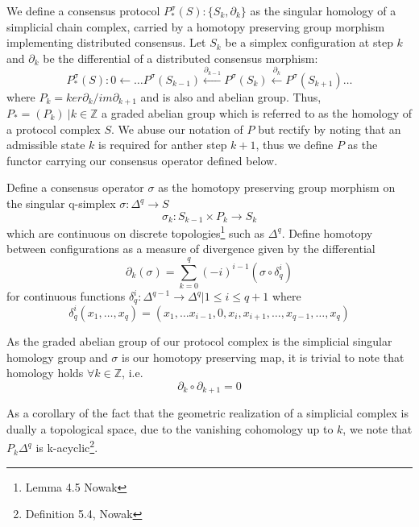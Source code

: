 \documentclass{article}
\begin{document}
We define a consensus protocol $P^\sigma_{*}(S):\{S_k, \partial_k\}$ as the singular homology of a simplicial chain complex, carried by a homotopy preserving group morphism implementing distributed consensus. Let $S_k$ be a simplex configuration at step $k$ and $\partial_k$ be the differential of a distributed consensus morphism:
\begin{equation} \label{eq1}
P^\sigma_{*}(S): 0 \leftarrow \dots P^\sigma(S_{k-1})\xleftarrow {\partial_{k-1}} P^\sigma(S_{k})\xleftarrow {\partial_{k}} P^\sigma(S_{k+1}) \dots
\end{equation} \label{eq1}
where $P_k = ker \partial_k / im \partial_{k+1}$ and is also and abelian group. Thus, $P_*= (P_k) \ | k \in \mathbb{Z}$ a graded abelian group which is referred to as the homology of a protocol complex $S$. We abuse our notation of $P$ but rectify by noting that an admissible state $k$ is required for anther step $k + 1$, thus we define $P$ as the functor carrying our consensus operator defined below.

Define a consensus operator $\sigma$ as the homotopy preserving group morphism on the singular q-simplex $\sigma: \Delta^q \rightarrow S$ 
\begin{equation} \label{eq1}
\sigma_k: S_{k-1} \times P_k \rightarrow S_{k}
\end{equation} \label{eq1}
which are continuous on discrete topologies\footnote{Lemma 4.5 Nowak} such as $\Delta^q$. Define homotopy between configurations as a measure of divergence given by the differential 
\begin{equation} \label{eq1}
\partial_k(\sigma) = \sum^{q}_{k=0} (-i)^{i-1}(\sigma \circ \delta_q^{i} )
\end{equation} \label{eq1}
for continuous functions $\delta^{i}_q: \Delta^{q-1} \rightarrow \Delta^q | 1 \leq i \leq q+1$ where 
\begin{equation} \label{eq1}
\delta^{i}_q(x_1, \dots, x_q) = (x_1, \dots x_{i-1}, 0, x_i, x_{i+1}, \dots, x_{q-1}, \dots, x_q)
\end{equation} \label{eq1}

As the graded abelian group of our protocol complex is the simplicial singular homology group and $\sigma$ is our homotopy preserving map, it is trivial to note that homology holds $\forall k \in \mathbb{Z}$, i.e.
\begin{equation} \label{eq1}
\partial_k \circ \partial_{k+1} = 0
\end{equation} \label{eq1}

As a corollary of the fact that the geometric realization of a simplicial complex is dually a topological space, due to the vanishing cohomology up to $k$, we note that $P_k\Delta^q$ is k-acyclic\footnote{Definition 5.4, Nowak}.
\end{document}
